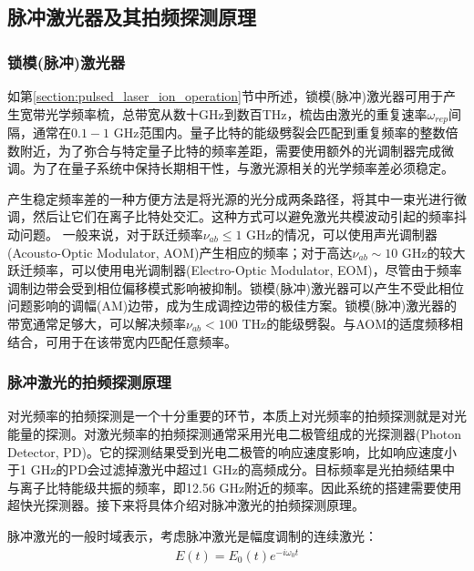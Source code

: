 \subsection[脉冲激光器及其拍频探测原理]{脉冲激光器及其拍频探测原理}
\subsubsection[锁模(脉冲)激光器]{锁模(脉冲)激光器}
如第\ref{section:pulsed_laser_ion_operation}节中所述，锁模(脉冲)激光器可用于产生宽带光学频率梳，总带宽从数十GHz到数百THz，梳齿由激光的重复速率$\omega_{rep}$间隔，通常在$0.1-1 $ GHz范围内。量子比特的能级劈裂会匹配到重复频率的整数倍数附近，为了弥合与特定量子比特的频率差距，需要使用额外的光调制器完成微调\cite[]{Hayes_Matsukevich_Maunz_Hucul_Quraishi_Olmschenk_Campbell_Mizrahi_Senko_Monroe_2010}。为了在量子系统中保持长期相干性，与激光源相关的光学频率差必须稳定\cite[]{Stick_Hensinger_Olmschenk_Madsen_Schwab_Monroe_2006}。

产生稳定频率差的一种方便方法是将光源的光分成两条路径，将其中一束光进行微调，然后让它们在离子比特处交汇。这种方式可以避免激光共模波动引起的频率抖动问题\cite[]{Thomas_Hemmer_Ezekiel_Leiby_Picard_Willis_2002}。
一般来说，对于跃迁频率$\nu_{ab}\leq 1$ GHz的情况，可以使用声光调制器(Acousto-Optic Modulator, AOM)产生相应的频率；对于高达$\nu_{ab} \sim 10 $ GHz的较大跃迁频率，可以使用电光调制器(Electro-Optic Modulator, EOM)，尽管由于频率调制边带会受到相位偏移模式影响被抑制\cite[]{Lee_Blinov_Brickman_Deslauriers_Madsen_Miller_Moehring_Stick_Monroe_2003}。锁模(脉冲)激光器可以产生不受此相位问题影响的调幅(AM)边带，成为生成调控边带的极佳方案。锁模(脉冲)激光器的带宽通常足够大，可以解决频率$\nu_{ab} < 100 $ THz的能级劈裂。与AOM的适度频移相结合，可用于在该带宽内匹配任意频率。

\subsubsection[脉冲激光的拍频探测原理]{脉冲激光的拍频探测原理}
对光频率的拍频探测是一个十分重要的环节，本质上对光频率的拍频探测就是对光能量的探测。对激光频率的拍频探测通常采用光电二极管组成的光探测器(Photon Detector, PD)。它的探测结果受到光电二极管的响应速度影响，比如响应速度小于1 GHz的PD会过滤掉激光中超过1 GHz的高频成分。目标频率是光拍频结果中与离子比特能级共振的频率，即12.56 GHz附近的频率。因此系统的搭建需要使用超快光探测器。接下来将具体介绍对脉冲激光的拍频探测原理。

脉冲激光的一般时域表示，考虑脉冲激光是幅度调制的连续激光：
\begin{align}
    E(t)=E_0 (t) e^{-i\omega_0 t}
\end{align}

